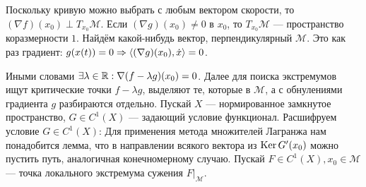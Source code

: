\documentclass[a4paper]{article}
\begin{document}
    Поскольку кривую можно выбрать с любым вектором скорости, то $(\nabla f)(x_0) \perp T_{x_0}\mathcal{M}$.
    Если $(\nabla g)(x_0) \ne 0$ в $x_0$, то $T_{x_0}\mathcal{M}$ --- пространство коразмерности $1$.
    Найдём какой-нибудь вектор, перпендикулярный $\mathcal{M}$.
    Это как раз градиент: $g(x(t)) = 0 \Rightarrow \left\langle(\nabla g)(x_0), \dot{x}\right\rangle = 0$.

    Иными словами $\exists \lambda\in\mathbb{R}: \nabla(f - \lambda g)(x_0) = 0$.
    Далее для поиска экстремумов ищут критические точки $f - \lambda g$, выделяют те, которые в $\mathcal{M}$, а с обнулениями градиента $g$ разбираются отдельно.
\ok
    Пускай $X$ --- нормированное замкнутое пространство, $G \in C^1(X)$ --- задающий условие функционал.
    Расшифруем условие $G \in C^1(X)$:
    Для применения метода множителей Лагранжа нам понадобится лемма, что в направлении всякого вектора из $\operatorname{Ker} G'(x_0)$ можно пустить путь, аналогичная конечномерному случаю.
    Пускай $F \in C^1(X), x_0 \in \mathcal{M}$ --- точка локального экстремума сужения $F\big|_{\mathcal{M}}$.
\end{document}
